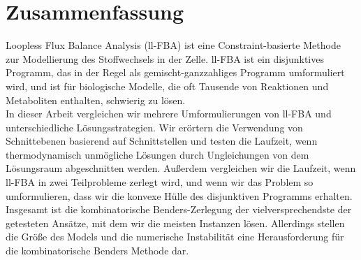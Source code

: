 \section*{\centering Zusammenfassung}

Loopless Flux Balance Analysis (ll-FBA) ist eine Constraint-basierte Methode zur Modellierung des Stoffwechsels in der Zelle.
ll-FBA ist ein disjunktives Programm, das in der Regel als gemischt-ganzzahliges Programm umformuliert wird, und ist für biologische Modelle, die oft Tausende von Reaktionen und Metaboliten enthalten, schwierig zu lösen. \\
In dieser Arbeit vergleichen wir mehrere Umformulierungen von ll-FBA und unterschiedliche Lösungsstrategien. Wir erörtern die Verwendung von Schnittebenen basierend auf Schnittstellen und testen die Laufzeit, wenn thermodynamisch unmögliche Lösungen durch Ungleichungen von dem Lösungsraum abgeschnitten werden. Außerdem vergleichen wir die Laufzeit, wenn ll-FBA in zwei Teilprobleme zerlegt wird, und wenn wir das Problem so umformulieren, dass wir die konvexe Hülle des disjunktiven Programms erhalten.\\
Insgesamt ist die kombinatorische Benders-Zerlegung der vielversprechendste der getesteten Ansätze, mit dem wir die meisten Instanzen lösen. 
Allerdings stellen die Größe des Models
und die numerische Instabilität eine Herausforderung für die kombinatorische Benders Methode dar.

